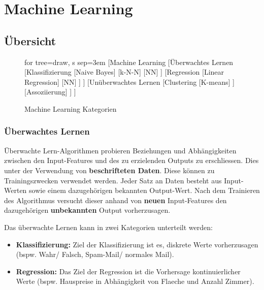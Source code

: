 \documentclass{article}
\begin{document}
\setcounter{page}{1}		%




\newpage
\section{Machine Learning}
\label{sec:ml}

\subsection{Übersicht}


\begin{figure}[H]
	\centering
	\label{fig:ml_overview}
	\begin{forest}
	for tree={draw, s sep=3em}
	[Machine Learning
	    [Überwachtes Lernen
	        [Klassifizierung
	            [Naive Bayes]
	             [k-N-N]
	             [NN]
	        ]
	        [Regression
	            [Linear Regression]
	            [NN]
	        ]
	    ]
	    [Unüberwachtes Lernen
	        [Clustering
	            [K-means]
	        ]
	        [Assoziierung]
	    ]
	]
	\end{forest}
	\caption{Machine Learning Kategorien}
\end{figure}

\subsubsection{Überwachtes Lernen}
\begin{flushleft}

Überwachte Lern-Algorithmen probieren Beziehungen und Abhängigkeiten zwischen den Input-Features und des zu erzielenden Outputs zu erschliessen. Dies unter der Verwendung von \textbf{beschrifteten Daten}. Diese können zu Trainingszwecken verwendet werden. Jeder Satz an Daten besteht aus Input-Werten sowie einem dazugehörigen bekannten Output-Wert. Nach dem Trainieren des Algorithmus versucht dieser anhand von \textbf{neuen} Input-Features den dazugehörigen \textbf{unbekannten} Output vorherzusagen.
\linebreak

Das überwachte Lernen kann in zwei Kategorien unterteilt werden:

\begin{itemize}
	\item \textbf{Klassifizierung:} Ziel der Klassifizierung ist es, diskrete Werte vorherzusagen (bspw. Wahr/ Falsch, Spam-Mail/ normales Mail). 
	\item \textbf{Regression:} Das Ziel der Regression ist die Vorhersage kontinuierlicher Werte (bspw. Hauspreise in Abhängigkeit von Flaeche und Anzahl Zimmer).
\end{itemize}

\end{flushleft}
\end{document}
